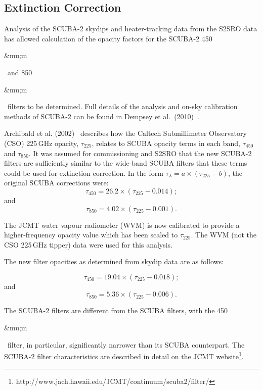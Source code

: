 \documentclass[twoside,11pt]{article}
\newcommand{\micron}{\mbox{\,${\umu}$m}}            %
\newcommand{\htmladdnormallinkfoot}[2]{#1\footnote{#2}}
\newcommand{\xlabel}[1]{}
\renewcommand{\_}{\texttt{\symbol{95}}}
\renewcommand{\micron}{\begin{rawhtml}&mu;m\end{rawhtml}}
\begin{document}
\subsection{\xlabel{extinction}Extinction Correction}

Analysis of the SCUBA-2 skydips and heater-tracking data from the
S2SRO data has allowed calculation of the opacity factors for the
SCUBA-2 450\micron\ and 850\micron\ filters to be determined. Full
details of the analysis and on-sky calibration methods of SCUBA-2 can
be found in Dempsey et al.\ (2010)~\cite{dempsey-spie}.

Archibald et al. (2002)~\cite{archibald} describes how the
Caltech Submillimeter Observatory (CSO) 225\,GHz opacity,
$\tau_{225}$, relates to SCUBA opacity terms in each band,
$\tau_{450}$ and $\tau_{850}$. It was assumed for commissioning and
S2SRO that the new SCUBA-2 filters are sufficiently similar to the
wide-band SCUBA filters that these terms could be used for extinction
correction. In the form $\tau_{\lambda} = a \times (\tau_{225} - b)$,
the original SCUBA corrections were:
\begin{equation}
\tau_{450} = 26.2 \times (\tau_{225} - 0.014);
\end{equation}
and
\begin{equation}
\tau_{850} = 4.02 \times (\tau_{225} - 0.001).
\end{equation}

The JCMT water vapour radiometer (WVM) is now calibrated to provide a
higher-frequency opacity value which has been scaled to
$\tau_{225}$. The WVM (not the CSO 225\,GHz tipper) data were used for
this analysis.

The new filter opacities as determined from skydip data are as
follows:

\begin{equation}
\tau_{450} = 19.04 \times (\tau_{225} - 0.018);
\end{equation}
and
\begin{equation}
\tau_{850} = 5.36 \times (\tau_{225} - 0.006).
\end{equation}

The SCUBA-2 filters are different from the SCUBA filters, with the
450\micron\ filter, in particular, significantly narrower than its
SCUBA counterpart. The SCUBA-2 filter characteristics are described in
detail \htmladdnormallinkfoot{on the JCMT
  website}{http://www.jach.hawaii.edu/JCMT/continuum/scuba2/filter/}.
\end{document}
